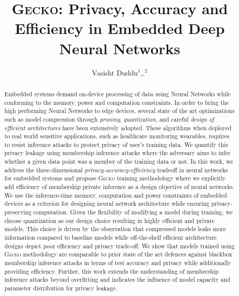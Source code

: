 \documentclass[sigconf]{acmart}
\newcommand{\method}{{\scshape Gecko}}
\begin{document}
\title{\method: Privacy, Accuracy and Efficiency in Embedded Deep Neural Networks}

\author{Vasisht Duddu$^1$,.$^2$}


\begin{abstract}
Embedded systems demand on-device processing of data using Neural Networks while conforming to the memory, power and computation constraints.
In order to bring the high performing Neural Networks to edge devices, several state of the art optimizations such as model compression through \textit{pruning}, \textit{quantization}, and careful \textit{design of efficient architectures} have been extensively adopted.
These algorithms when deployed to real world sensitive applications, such as healthcare monitoring wearables, requires to resist inference attacks to protect privacy of user's training data.
We quantify this privacy leakage using membership inference attacks where the adversary aims to infer whether a given data point was a member of the training data or not.
In this work, we address the three-dimensional \textit{privacy-accuracy-efficiency} tradeoff in neural networks for embedded systems and propose \method\hspace{0.02in} training methodology where we explicitly add efficiency of membership private inference as a design objective of neural networks.
We use the inference-time memory, computation and power constraints of embedded devices as a criterion for designing neural network architecture while ensuring privacy-preserving computation.
Given the flexibility of modifying a model during training, we choose quantization as our design choice resulting in highly efficient and private models.
This choice is driven by the observation that compressed models leaks more information compared to baseline models while off-the-shelf efficient architecture designs depict poor efficiency and privacy trade-off.
We show that models trained using \method\hspace{0.02in} methodology are comparable to prior state of the art defences against blackbox membership inference attacks in terms of test accuracy and privacy while additionally providing efficiency.
Further, this work extends the understanding of membership inference attacks beyond overfitting and indicates the influence of model capacity and parameter distribution for privacy leakage.
\end{abstract}

\maketitle











%
%



\end{document}
